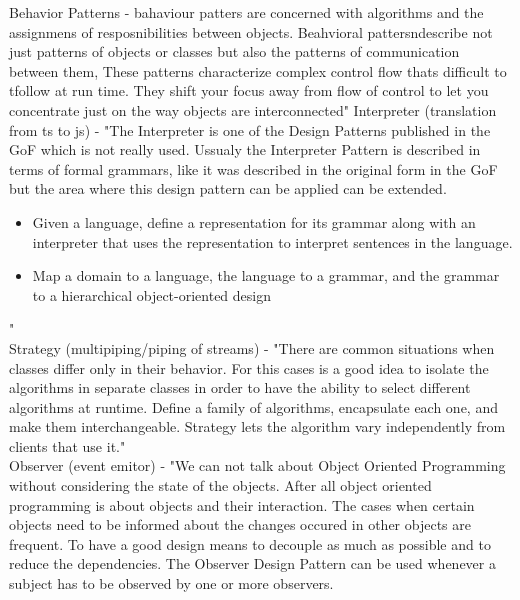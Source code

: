 \documentclass{llncs}
\begin{document}
Behavior Patterns - bahaviour patters are concerned with algorithms and the assignmens of resposnibilities between objects. Beahvioral pattersndescribe not just patterns of objects or classes but also the patterns of communication between them, These patterns characterize complex control flow thats difficult to tfollow at run time. They shift your focus away from flow of control to let you concentrate just on the way objects are interconnected"\cite{DesignPatterns}
Interpreter (translation from ts to js) - "The Interpreter is one of the Design Patterns published in the GoF which is not really used. Ussualy the Interpreter Pattern is described in terms of formal grammars, like it was described in the original form in the GoF but the area where this design pattern can be applied can be extended.
\begin{itemize}
\item Given a language, define a representation for its grammar along with an interpreter that uses the representation to interpret sentences in the language.
\item Map a domain to a language, the language to a grammar, and the grammar to a hierarchical object-oriented design
\end{itemize}"\cite{oosite}\\
Strategy (multipiping/piping of streams) - "There are common situations when classes differ only in their behavior. For this cases is a good idea to isolate the algorithms in separate classes in order to have the ability to select different algorithms at runtime. 
Define a family of algorithms, encapsulate each one, and make them interchangeable. Strategy lets the algorithm vary independently from clients that use it."\cite{oosite}\\
Observer (event emitor) - "We can not talk about Object Oriented Programming without considering the state of the objects. After all object oriented programming is about objects and their interaction. The cases when certain objects need to be informed about the changes occured in other objects are frequent. To have a good design means to decouple as much as possible and to reduce the dependencies. The Observer Design Pattern can be used whenever a subject has to be observed by one or more observers.
\end{document}
